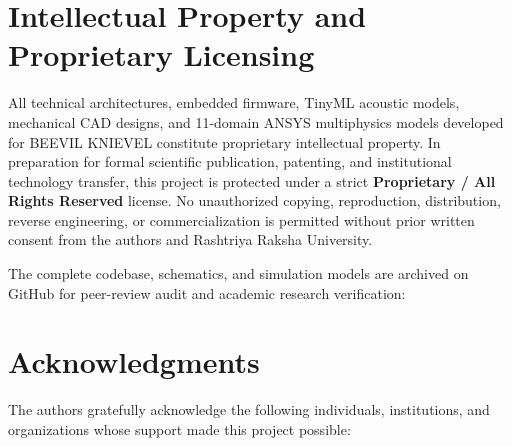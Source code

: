 \documentclass[12pt,a4paper]{article}
\begin{document}
\section{Intellectual Property and Proprietary Licensing}

All technical architectures, embedded firmware, TinyML acoustic models, mechanical CAD designs, and 11-domain ANSYS multiphysics models developed for BEEVIL KNIEVEL constitute proprietary intellectual property. In preparation for formal scientific publication, patenting, and institutional technology transfer, this project is protected under a strict \textbf{Proprietary / All Rights Reserved} license. No unauthorized copying, reproduction, distribution, reverse engineering, or commercialization is permitted without prior written consent from the authors and Rashtriya Raksha University.

The complete codebase, schematics, and simulation models are archived on GitHub for peer-review audit and academic research verification:

\begin{center}
\vspace{-2mm}
\vspace{-2mm}
\end{center}

\clearpage
\section{Acknowledgments}

The authors gratefully acknowledge the following individuals, institutions, and organizations whose support made this project possible:
\end{document}
